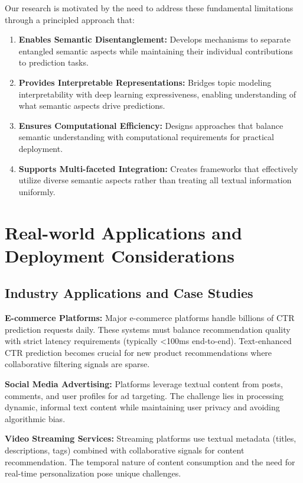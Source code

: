Our research is motivated by the need to address these fundamental limitations through a principled approach that:

\begin{enumerate}
    \item \textbf{Enables Semantic Disentanglement:} Develops mechanisms to separate entangled semantic aspects while maintaining their individual contributions to prediction tasks.
    
    \item \textbf{Provides Interpretable Representations:} Bridges topic modeling interpretability with deep learning expressiveness, enabling understanding of what semantic aspects drive predictions.
    
    \item \textbf{Ensures Computational Efficiency:} Designs approaches that balance semantic understanding with computational requirements for practical deployment.
    
    \item \textbf{Supports Multi-faceted Integration:} Creates frameworks that effectively utilize diverse semantic aspects rather than treating all textual information uniformly.
\end{enumerate}

\section{Real-world Applications and Deployment Considerations}

\subsection{Industry Applications and Case Studies}

\textbf{E-commerce Platforms:} Major e-commerce platforms handle billions of CTR prediction requests daily. These systems must balance recommendation quality with strict latency requirements (typically <100ms end-to-end). Text-enhanced CTR prediction becomes crucial for new product recommendations where collaborative filtering signals are sparse.

\textbf{Social Media Advertising:} Platforms leverage textual content from posts, comments, and user profiles for ad targeting. The challenge lies in processing dynamic, informal text content while maintaining user privacy and avoiding algorithmic bias.

\textbf{Video Streaming Services:} Streaming platforms use textual metadata (titles, descriptions, tags) combined with collaborative signals for content recommendation. The temporal nature of content consumption and the need for real-time personalization pose unique challenges.

